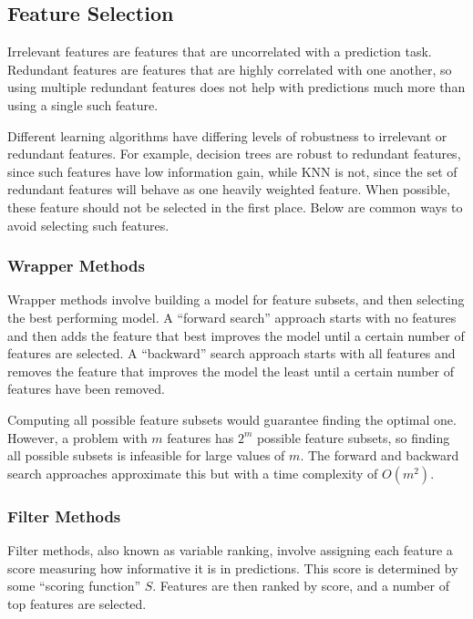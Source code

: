 \documentclass[12pt,titlepage]{article}
\begin{document}
    \subsection{Feature Selection}
      Irrelevant features are features that are uncorrelated with a prediction task. Redundant features are features that are highly correlated with
      one another, so using multiple redundant features does not help with predictions much more than using a single such feature.

      Different learning algorithms have differing levels of robustness to irrelevant or redundant features. For example, decision trees are robust
      to redundant features, since such features have low information gain, while KNN is not, since the set of redundant features will behave as one heavily
      weighted feature. When possible, these feature should not be selected in the first place. Below are common ways to avoid selecting such features.

      \subsubsection{Wrapper Methods}
        Wrapper methods involve building a model for feature subsets, and then selecting the best performing model. A ``forward search'' approach
        starts with no features and then adds the feature that best improves the model until a certain number of features are selected.  A
        ``backward'' search approach starts with all features and removes the feature that improves the model the least until a certain number
        of features have been removed.

        Computing all possible feature subsets would guarantee finding the optimal one. However, a problem with $m$ features has $2^m$ possible
        feature subsets, so finding all possible subsets is infeasible for large values of $m$. The forward and backward search approaches
        approximate this but with a time complexity of $O(m^2)$.

      \subsubsection{Filter Methods}
        Filter methods, also known as variable ranking, involve assigning each feature a score measuring how informative it is in predictions. This
        score is determined by some ``scoring function'' $S$. Features are then ranked by score, and a number of top features are selected.
\end{document}
